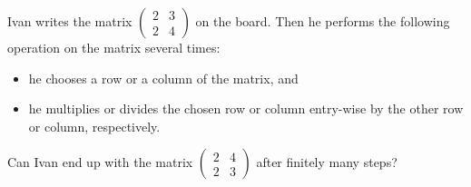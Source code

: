 Ivan writes the matrix \(\begin{pmatrix} 2 & 3 \\ 2 & 4 \end{pmatrix}\) on the board. Then he performs the following operation on the matrix several times:
\begin{itemize}
    \item he chooses a row or a column of the matrix, and
    \item he multiplies or divides the chosen row or column entry-wise by the other row or column, respectively.
\end{itemize}
Can Ivan end up with the matrix \(\begin{pmatrix} 2 & 4 \\ 2 & 3 \end{pmatrix}\) after finitely many steps?
